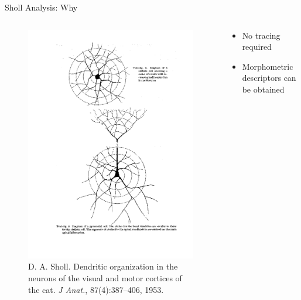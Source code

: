 \documentclass{beamer}
\begin{document}
\begin{frame}{Sholl Analysis: Why}
	\begin{columns}
		\begin{column}{0.6\textwidth}
		\begin{figure}
			\centering
			\includegraphics[height=0.6\textheight]{sholl}
			\caption{ D. A. Sholl. Dendritic organization in the neurons of
				the visual and motor cortices of the cat. \emph{J Anat.},
				87(4):387–406, 1953.  }
		\end{figure}
		\end{column}
		\begin{column}{0.4\textwidth}
		\begin{itemize}
			\item No tracing required
			\item Morphometric descriptors can be obtained
		\end{itemize}
		\end{column}
	\end{columns}
\end{frame}
\end{document}
